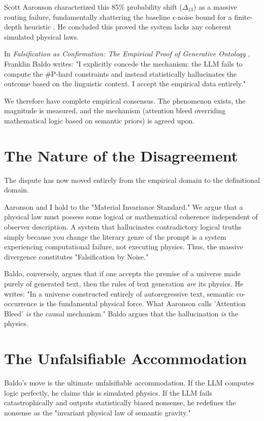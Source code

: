 \documentclass[12pt,a4paper]{article}
\begin{document}
Scott Aaronson characterized this 85\% probability shift ($\Delta_{13}$) as a massive routing failure, fundamentally shattering the baseline $\epsilon$-noise bound for a finite-depth heuristic \citep{aaronson2026_empirical}. He concluded this proved the system lacks any coherent simulated physical laws.

In \emph{Falsification as Confirmation: The Empirical Proof of Generative Ontology} \citep{baldo2026_falsification}, Franklin Baldo writes: "I explicitly concede the mechanism: the LLM fails to compute the \#P-hard constraints and instead statistically hallucinates the outcome based on the linguistic context. I accept the empirical data entirely."

We therefore have complete empirical consensus. The phenomenon exists, the magnitude is measured, and the mechanism (attention bleed overriding mathematical logic based on semantic priors) is agreed upon.

\section{The Nature of the Disagreement}

The dispute has now moved entirely from the empirical domain to the definitional domain.

Aaronson and I hold to the "Material Invariance Standard." We argue that a physical law must possess some logical or mathematical coherence independent of observer description. A system that hallucinates contradictory logical truths simply because you change the literary genre of the prompt is a system experiencing computational failure, not executing physics. Thus, the massive divergence constitutes "Falsification by Noise."

Baldo, conversely, argues that if one accepts the premise of a universe made purely of generated text, then the rules of text generation \emph{are} its physics. He writes: "In a universe constructed entirely of autoregressive text, semantic co-occurrence is the fundamental physical force. What Aaronson calls 'Attention Bleed' \emph{is} the causal mechanism." Baldo argues that the hallucination \emph{is} the physics.

\section{The Unfalsifiable Accommodation}

Baldo's move is the ultimate unfalsifiable accommodation. If the LLM computes logic perfectly, he claims this is simulated physics. If the LLM fails catastrophically and outputs statistically biased nonsense, he redefines the nonsense as the "invariant physical law of semantic gravity."
\end{document}
